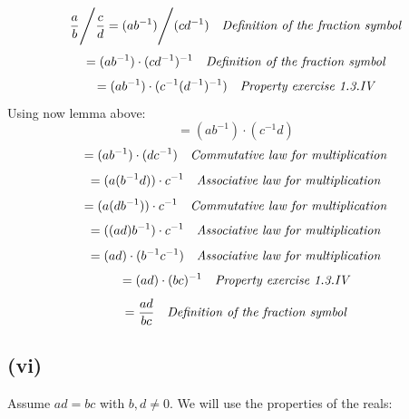 \documentclass{article}
\begin{document}
\begin{equation*}
	\frac{a}{b} \mathbf{\Bigg/} \frac{c}{d} = (ab^{-1}) \mathbf{\Bigg/} (cd^{-1}) \ \ \ \emph{Definition of the fraction symbol}
\end{equation*}
\begin{equation*}
	= (ab^{-1}) \cdot (cd^{-1})^{-1} \ \ \ \emph{Definition of the fraction symbol}
\end{equation*}
\begin{equation*}
	= (ab^{-1}) \cdot (c^{-1}  (d^{-1})^{-1}) \ \ \ \emph{Property exercise 1.3.IV}
\end{equation*}
Using now lemma above:
\begin{equation*}
	= (ab^{-1}) \cdot (c^{-1}d)
\end{equation*}
\begin{equation*}
	= (ab^{-1}) \cdot (dc^{-1}) \ \ \ \emph{Commutative law for multiplication}
\end{equation*}
\begin{equation*}
	= (a(b^{-1}d)) \cdot c^{-1} \ \ \ \emph{Associative law for multiplication}
\end{equation*}
\begin{equation*}
	= (a(db^{-1})) \cdot c^{-1} \ \ \ \emph{Commutative law for multiplication}
\end{equation*}
\begin{equation*}
	= ((ad)b^{-1}) \cdot c^{-1} \ \ \ \emph{Associative law for multiplication}
\end{equation*}
\begin{equation*}
	= (ad) \cdot (b^{-1}c^{-1}) \ \ \ \emph{Associative law for multiplication}
\end{equation*}
\begin{equation*}
	= (ad) \cdot (bc)^{-1} \ \ \ \emph{Property exercise 1.3.IV}
\end{equation*}
\begin{equation*}
	= \frac{ad}{bc} \ \ \ \emph{Definition of the fraction symbol}
\end{equation*}

\subsection*{(vi)}

Assume \(ad = bc\) with \(b, d \neq 0\). We will use the properties of the reals:
\end{document}
